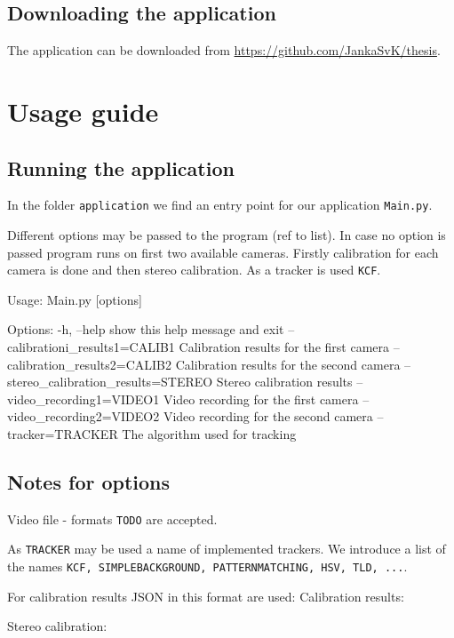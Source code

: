 \subsection{Downloading the application}
The application can be downloaded from \url{https://github.com/JankaSvK/thesis}.

\section{Usage guide}

\subsection{Running the application}
In the folder \verb+application+ we find an entry point for our application
\verb+Main.py+.

Different options may be passed to the program (ref to list). In case no option
is passed program runs on first two available cameras. Firstly calibration for
each camera is done and then stereo calibration. As a tracker is used \verb+KCF+.

\begin{code}
Usage: Main.py [options]

Options:
  -h, --help            show this help message and exit
  --calibrationi\_results1=CALIB1
                        Calibration results for the first camera
  --calibration\_results2=CALIB2
                        Calibration results for the second camera
  --stereo\_calibration\_results=STEREO
                        Stereo calibration results
  --video\_recording1=VIDEO1
                        Video recording for the first camera
  --video\_recording2=VIDEO2
                        Video recording for the second camera
  --tracker=TRACKER     The algorithm used for tracking
\end{code}

\subsection{Notes for options}
Video file
- formats \verb+TODO+ are accepted.

As \verb+TRACKER+ may be used a name of implemented trackers. We introduce a list of the names \verb+KCF, SIMPLEBACKGROUND, PATTERNMATCHING, HSV, TLD, ...+.

For calibration results JSON in this format are used:
Calibration results:


Stereo calibration:
\begin{code}

\end{code}
